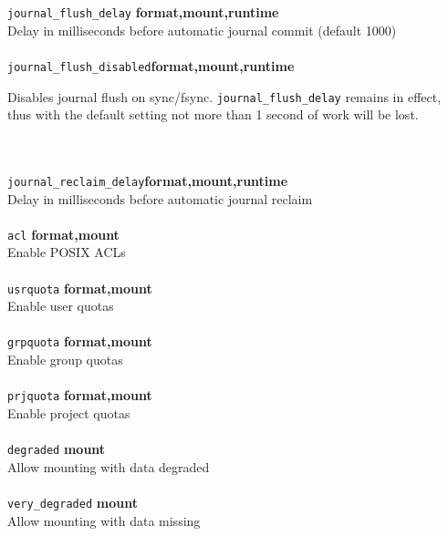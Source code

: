 \documentclass{article}
\begin{document}
\begin{tabbing}
	\texttt{journal\_flush\_delay}	\` \textbf{format,mount,runtime}	\\
	\> Delay in milliseconds before automatic journal commit (default 1000)	\\ \\

	\texttt{journal\_flush\_disabled}\`\textbf{format,mount,runtime}	\\
	\> \begin{minipage}{4.3in}Disables journal flush on sync/fsync.
		\texttt{journal\_flush\_delay}	remains in effect, thus with the
		default setting not more than 1 second of work will be lost.
	\end{minipage}								\\ \\

	\texttt{journal\_reclaim\_delay}\` \textbf{format,mount,runtime}	\\
	\> Delay in milliseconds before automatic journal reclaim		\\ \\

	\texttt{acl}			\` \textbf{format,mount}		\\
	\> Enable POSIX ACLs							\\ \\

	\texttt{usrquota}		\` \textbf{format,mount}		\\
	\> Enable user quotas							\\ \\

	\texttt{grpquota}		\` \textbf{format,mount}		\\
	\> Enable group quotas							\\ \\

	\texttt{prjquota}		\` \textbf{format,mount}		\\
	\> Enable project quotas						\\ \\

	\texttt{degraded}		\` \textbf{mount}			\\
	\> Allow mounting with data degraded					\\ \\

	\texttt{very\_degraded}		\` \textbf{mount}			\\
	\> Allow mounting with data missing					\\ \\


\end{tabbing}
\end{document}
